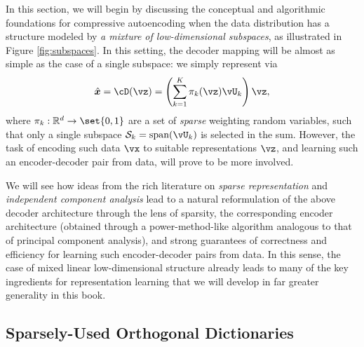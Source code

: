 \documentclass[\toplevelprefix/book-main.tex]{subfiles}
\begin{document}
In this section, we will begin by discussing the conceptual and algorithmic foundations for compressive autoencoding when the data distribution has a structure modeled by {\em a mixture of low-dimensional subspaces}, as illustrated in Figure \ref{fig:subspaces}. In this setting, the decoder mapping will be almost as simple as the case of a single subspace: we simply represent via
\begin{equation}\label{eq:mixture-subspaces-decoder-first-cut}
    \hat{\x} = \cD(\vz) = \left( \sum_{k=1}^K \pi_k(\vz)\vU_k \right) \vz,
\end{equation}
where $\pi_k : \R^d \to \set{0,1}$ are a set of \textit{sparse} weighting random variables, such that only a single subspace $\mathcal{S}_k = \mbox{span}(\vU_k) $ is selected in the sum.
However, the task of encoding such data $\vx$ to suitable representations $\vz$, and learning such an encoder-decoder pair from data, will prove to be more involved.

We will see how ideas from the rich literature on \textit{sparse representation} and \textit{independent component analysis} lead to a natural reformulation of the above decoder architecture through the lens of sparsity, the corresponding encoder architecture (obtained through a power-method-like algorithm analogous to that of principal component analysis), and strong guarantees of correctness and efficiency for learning such encoder-decoder pairs from data. In this sense, the case of mixed linear low-dimensional structure already leads to many of the key ingredients for representation learning that we will develop in far greater generality in this book.


\subsection{Sparsely-Used Orthogonal Dictionaries}

\end{document}
